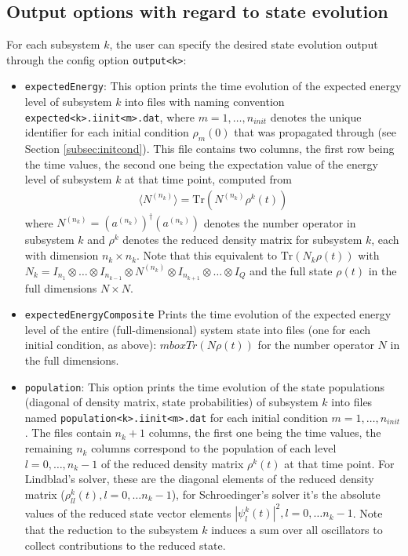 \documentclass[11pt]{article}
\begin{document}
\subsection{Output options with regard to state evolution}
For each subsystem $k$, the user can specify the desired state evolution output through the config option \texttt{output<k>}:
\begin{itemize}
  \item \texttt{expectedEnergy}: This option prints the time evolution of the expected energy level of subsystem $k$ into files with naming convention \texttt{expected<k>.iinit<m>.dat}, where $m=1,\dots,n_{init}$ denotes the unique identifier for each initial condition $\rho_m(0)$ that was propagated through (see Section \ref{subsec:initcond}). This file contains two columns, the first row being the time values, the second one being the expectation value of the energy level of subsystem $k$ at that time point, computed from 
  \begin{align}
    \langle N^{(n_k)}\rangle = \mbox{Tr}\left(N^{(n_k)} \rho^k(t)\right)
  \end{align}
  where $N^{(n_k)} = \left(a^{(n_k)}\right)^\dagger \left(a^{(n_k)}\right)$ denotes the number operator in subsystem $k$ and $\rho^k$ denotes the reduced density matrix for subsystem $k$, each with dimension $n_k\times n_k$. Note that this equivalent to $\mbox{Tr}\left(N_k \rho(t)\right)$ with $N_k = I_{n_1} \otimes \dots \otimes I_{n_{k-1}} \otimes N^{(n_k)} \otimes I_{n_{k+1}}\otimes \dots \otimes I_Q$ and the full state $\rho(t)$ in the full dimensions $N\times N$.
  \item \texttt{expectedEnergyComposite} Prints the time evolution of the expected energy level of the entire (full-dimensional) system state into files (one for each initial condition, as above): $mbox{Tr}\left(N \rho(t)\right)$ for the number operator $N$ in the full dimensions. 
  \item \texttt{population}: This option prints the time evolution of the state populations (diagonal of density matrix, state probabilities) of subsystem $k$ into files named \texttt{population<k>.iinit<m>.dat} for each initial condition $m=1,\dots, n_{init}$. The files contain $n_k+1$ columns, the first one being the time values, the remaining $n_k$ columns correspond to the population of each level $l=0,\dots,n_k-1$ of the reduced density matrix $\rho^k(t)$ at that time point. For Lindblad's solver, these are the diagonal elements of the reduced density matrix ($\rho_{ll}^k(t), l=0,\dots n_k-1$), for Schroedinger's solver it's the absolute values of the reduced state vector elements $|\psi^k_l(t)|^2, l=0,\dots n_k-1$. Note that the reduction to the subsystem $k$ induces a sum over all oscillators to collect contributions to the reduced state. 

\end{itemize}
\end{document}
